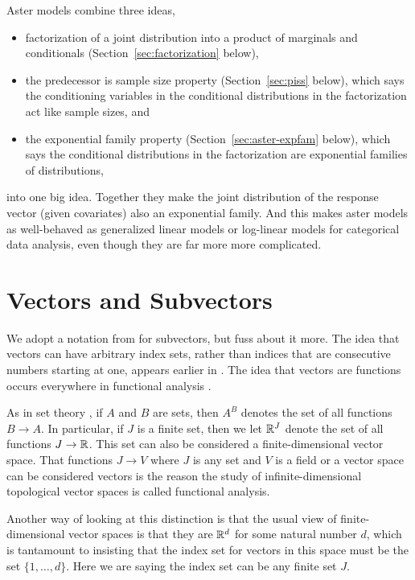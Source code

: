 Aster models combine three ideas,
\begin{itemize}
\item factorization of a joint distribution into a product of marginals
    and conditionals (Section~\ref{sec:factorization} below),
\item the predecessor is sample size property (Section~\ref{sec:piss} below),
    which says the conditioning variables in the conditional distributions
    in the factorization act like sample sizes, and
\item the exponential family property (Section~\ref{sec:aster-expfam} below),
    which says the conditional distributions in the factorization are
    exponential families of distributions,
\end{itemize}
into one big idea.  Together they make the joint distribution of the
response vector (given covariates) also an exponential family.
And this makes aster models
as well-behaved as generalized linear models or log-linear models for
categorical data analysis, even though they are far more more complicated.

\section{Vectors and Subvectors}
\label{sec:subvector}

We adopt a notation from \citet{lauritzen} for subvectors, but fuss about it
more.  The idea that vectors can have arbitrary index sets, rather than
indices that are consecutive numbers starting at one, appears earlier in
\citet{rockafellar-monotropic}.  The idea that vectors are functions
occurs everywhere in functional analysis \citep[Appendix~B, which discusses
history going back more than a century]{rudin}.

As in set theory \citep[Section~8]{halmos-set-theory}, if $A$ and $B$
are sets, then $A^B$ denotes the set of all functions $B \to A$.
In particular, if $J$ is a finite set, then we let $\mathbb{R}^J$ denote
the set of all functions $J \to \mathbb{R}$.  This set can also be considered
a finite-dimensional vector space.  That functions $J \to V$ where $J$ is
any set and $V$ is a field or a vector space can be considered
vectors is the reason the study of infinite-dimensional topological vector
spaces is called functional analysis.

Another way of looking at this distinction is that the usual view of
finite-dimensional vector spaces is that they are $\mathbb{R}^d$ for some
natural number $d$, which is tantamount to insisting that the index
set for vectors in this space must be the set $\{1, \ldots, d\}$.
Here we are saying the index set can be any finite set $J$.

